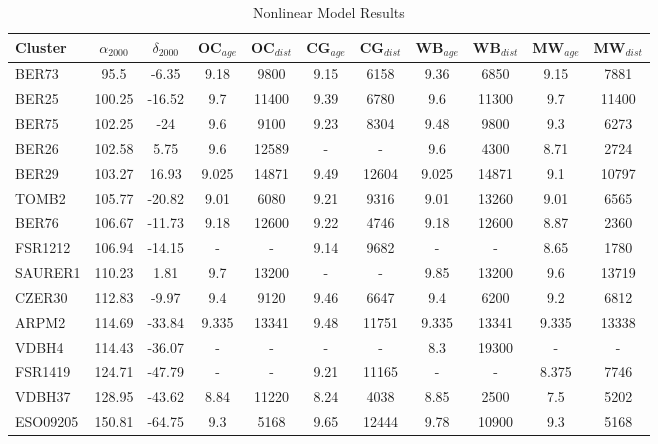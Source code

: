 \documentclass{aa}
\begin{document}
  \begin{table}
  \caption{Nonlinear Model Results}             %
  \label{table:1}      %
  \centering                          %
  \begin{tabular}{lcccccccccc}        %
  \hline\hline                 %
  Cluster & $\alpha_{2000}$  & $\delta_{2000}$ & OC$_{age}$ & OC$_{dist}$ & CG$_{age}$ &
  CG$_{dist}$ & WB$_{age}$ & WB$_{dist}$ & MW$_{age}$ & MW$_{dist}$ \\
  \hline
  BER73     & 95.5   & -6.35     & 9.18  & 9800  & 9.15  & 6158  & 9.36  & 6850 & 9.15  & 7881  \\
  BER25     & 100.25 & -16.52    & 9.7   & 11400 & 9.39  & 6780  & 9.6   & 11300 &  9.7   & 11400 \\
  BER75     & 102.25 & -24       & 9.6   & 9100  & 9.23  &  8304  & 9.48  & 9800  & 9.3   & 6273  \\
  BER26     & 102.58 & 5.75      & 9.6   & 12589 & -   & -   & 9.6   & 4300  & 8.71  & 2724  \\
  BER29     & 103.27 & 16.93     & 9.025 & 14871 & 9.49  & 12604 & 9.025 & 14871 & 9.1   & 10797 \\
  TOMB2     & 105.77 & -20.82    & 9.01  & 6080  & 9.21  & 9316  & 9.01  & 13260 & 9.01  & 6565  \\
  BER76     & 106.67 & -11.73    & 9.18  & 12600 & 9.22  & 4746  & 9.18  & 12600 & 8.87  & 2360  \\
  FSR1212   & 106.94 & -14.15    & -   & -   & 9.14  & 9682  & -   & -   & 8.65  & 1780  \\
  SAURER1   & 110.23 & 1.81      & 9.7   & 13200 & -   & -   & 9.85  & 13200 & 9.6   & 13719 \\
  CZER30    & 112.83 & -9.97     & 9.4   & 9120  & 9.46  & 6647  & 9.4   & 6200  & 9.2   & 6812  \\
  ARPM2     & 114.69 & -33.84    & 9.335 & 13341 & 9.48  & 11751 & 9.335 & 13341 & 9.335 & 13338 \\
  VDBH4     & 114.43 & -36.07    & -   & -   & -   & -   & 8.3   & 19300 & -   & -   \\
  FSR1419   & 124.71 & -47.79    & -   & -   & 9.21  & 11165 & -   & -   & 8.375 & 7746  \\
  VDBH37    & 128.95 & -43.62    & 8.84  & 11220 & 8.24  & 4038  & 8.85  & 2500  & 7.5   & 5202  \\
  ESO09205  & 150.81 & -64.75    & 9.3   & 5168  & 9.65  & 12444 & 9.78  & 10900 & 9.3   & 5168  \\

\end{tabular}
\end{table}
\end{document}
